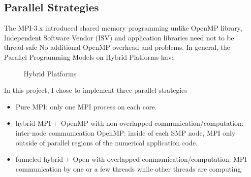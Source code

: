 \subsection{Parallel Strategies}
The MPI-3.x introduced shared memory programming unlike OpenMP library, 
Independent Software Vendor (ISV) and application libraries need not to be thread-safe
No additional OpenMP overhead and problems. 
In general, the Parallel Programming Models on Hybrid Platforms have 
                                              \cite{SUPERsmith}

\begin{figure}[htbp]
  \centering
  \caption{Hybrid Platforms\cite{SUPERsmith}}
  \label{FIG:Hybrid_Platforms}
\end{figure}
In this project, I chose to implement three parallel strategies
\begin{itemize}
  \item Pure MPI: only one MPI process on each core.
  \item hybrid MPI + OpenMP with non-overlapped communication/computation:
                          inter-node communication OpenMP: inside of each SMP node, 
                          MPI only outside of parallel regions of the numerical application code.
  \item funneled hybrid + Open with overlapped communication/computation: 
                          MPI communication by one or a few threads while other threads are computing.
\end{itemize}

